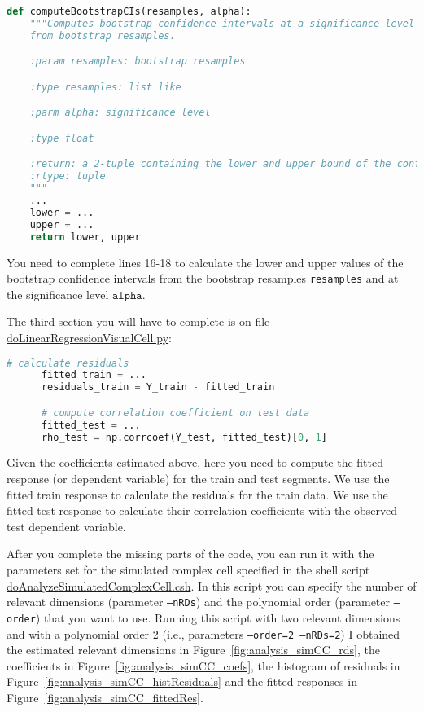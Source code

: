 \documentclass[12pt]{article}
\begin{document}
\begin{lstlisting}[language=python]
def computeBootstrapCIs(resamples, alpha):
    """Computes bootstrap confidence intervals at a significance level alpha
    from bootstrap resamples.

    :param resamples: bootstrap resamples

    :type resamples: list like

    :parm alpha: significance level

    :type float

    :return: a 2-tuple containing the lower and upper bound of the confidence interval.
    :rtype: tuple
    """
    ...
    lower = ...
    upper = ...
    return lower, upper
	\end{lstlisting}

You need to complete lines 16-18 to calculate the lower and upper values of the bootstrap confidence intervals from the bootstrap resamples \texttt{resamples} and at the significance level $\texttt{alpha}$.

The third section you will have to complete is on file
\href{https://github.com/joacorapela/neuroinformatics24/blob/master/worksheets/06_linearRegression/code/scripts/https://github.com/joacorapela/neuroinformatics24/blob/master/worksheets/06_linearRegression/code/scripts/doLinearRegressionVisualCell.py}{doLinearRegressionVisualCell.py}:

\begin{lstlisting}[language=python]
      # calculate residuals
      fitted_train = ...
      residuals_train = Y_train - fitted_train

      # compute correlation coefficient on test data
      fitted_test = ...
      rho_test = np.corrcoef(Y_test, fitted_test)[0, 1]
\end{lstlisting}

Given the coefficients estimated above, here you need to compute the fitted
response (or dependent variable) for the train and test segments. We use the
fitted train response to calculate the residuals for the train data. We use the
fitted test response to calculate their correlation coefficients with the
observed test dependent variable.

After you complete the missing parts of the code, you can run it with the
parameters set for the simulated complex cell specified in the shell script
\href{https://github.com/joacorapela/neuroinformatics24/blob/master/worksheets/06_linearRegression/code/scripts/doAnalyzeSimulatedComplexCell.csh}{doAnalyzeSimulatedComplexCell.csh}.
In this script you can specify the number of relevant dimensions (parameter
\texttt{--nRDs}) and the polynomial order (parameter \texttt{--order}) that you
want to use. Running this script with two relevant dimensions and with a
polynomial order 2 (i.e., parameters \texttt{--order=2 --nRDs=2}) I obtained the
estimated relevant dimensions in Figure~\ref{fig:analysis_simCC_rds}, the coefficients
in Figure~\ref{fig:analysis_simCC_coefs}, the histogram of residuals in
Figure~\ref{fig:analysis_simCC_histResiduals} and the fitted responses in
Figure~\ref{fig:analysis_simCC_fittedRes}.
\end{document}
